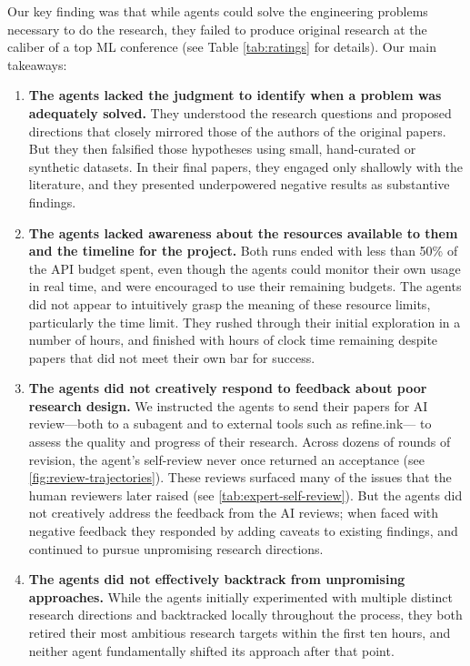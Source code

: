 \documentclass[]{crux} %
\begin{document}
Our key finding was that while agents could solve the engineering problems
necessary to do the research, they failed to produce original research at the
caliber of a top ML conference (see Table \ref{tab:ratings} for details). Our main takeaways:




\begin{enumerate}[leftmargin=*,itemsep=5pt]
  \item \textbf{The agents lacked the judgment to identify when a problem was
  adequately solved.} They understood the research questions and proposed
  directions that closely mirrored those of the authors of the original papers. But they
  then falsified those hypotheses using small, hand-curated or synthetic
  datasets. In their final papers, they engaged only shallowly with the
  literature, and they presented underpowered negative results as substantive findings.

  \item \textbf{The agents lacked awareness about the resources available to
  them and the timeline for the project.} Both runs ended with less than 50\%
  of the API budget spent, even though the agents could monitor their own usage
  in real time, and were encouraged to use their remaining budgets. The agents
  did not appear to intuitively grasp the meaning of these resource limits,
  particularly the time limit. They rushed through their initial exploration
  in a number of hours, and finished with hours of clock time remaining despite
  papers that did not meet their own bar for success.

  \item \textbf{The agents did not creatively respond to feedback about poor
  research design.} We instructed the agents to send their papers for AI
  review---both to a subagent and to external tools such as refine.ink---
  to assess the quality and progress of their research. Across dozens of rounds of
  revision, the agent's self-review never once returned an acceptance (see \cref{fig:review-trajectories}). These
  reviews surfaced many of the issues that the human reviewers later raised
  (see \cref{tab:expert-self-review}). But the agents did not creatively address
  the feedback from the AI reviews; when faced with negative feedback they
  responded by adding caveats to existing findings, and continued to pursue
  unpromising research directions.

  \item \textbf{The agents did not effectively backtrack from unpromising
  approaches.} While the agents initially experimented with multiple distinct
  research directions and backtracked locally throughout the process, they
  both retired their most ambitious research targets within the first ten
  hours, and neither agent fundamentally shifted its approach after that
  point.


\end{enumerate}
\end{document}
